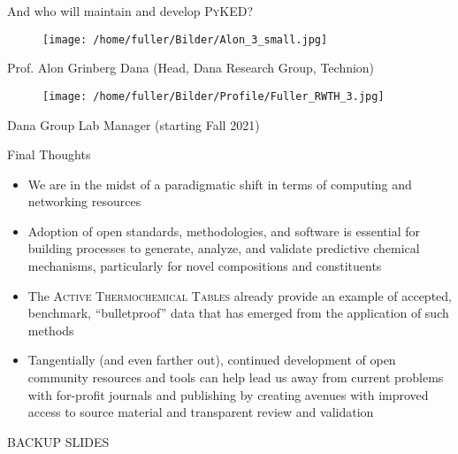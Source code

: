 \documentclass[10pt,presentation]{beamer}
\begin{document}
\begin{frame}{And who will maintain and develop \textsc{PyKED}?}
	\begin{multicols}{2}
		\begin{figure}
			\centering
			\texttt{[image: /home/fuller/Bilder/Alon\_3\_small.jpg]}
		\end{figure}
	\centering
	Prof. Alon Grinberg Dana (Head, Dana Research Group, Technion)
		\columnbreak
		\begin{figure}
			\centering
			\texttt{[image: /home/fuller/Bilder/Profile/Fuller\_RWTH\_3.jpg]}
		\end{figure}
	\centering
	 Dana Group Lab Manager (starting Fall 2021)
	\end{multicols}
\end{frame}

\begin{frame}{Final Thoughts}
	\begin{itemize}
		\item We are in the midst of a paradigmatic shift in terms of computing and networking resources
		\item Adoption of open standards, methodologies, and software is essential for building processes to generate, analyze, and validate predictive chemical mechanisms, particularly for novel compositions and constituents

		\item The \textsc{Active Thermochemical Tables} already provide an example of accepted, benchmark, ``bulletproof'' data that has emerged from the application of such methods
		
		\item Tangentially (and even farther out), continued development of open community resources and tools can help lead us away from current problems with for-profit journals and publishing by creating avenues with improved access to source material and transparent review and validation
	\end{itemize}
\end{frame} 

\begin{frame}
	\centering
	BACKUP SLIDES
\end{frame}
\end{document}
